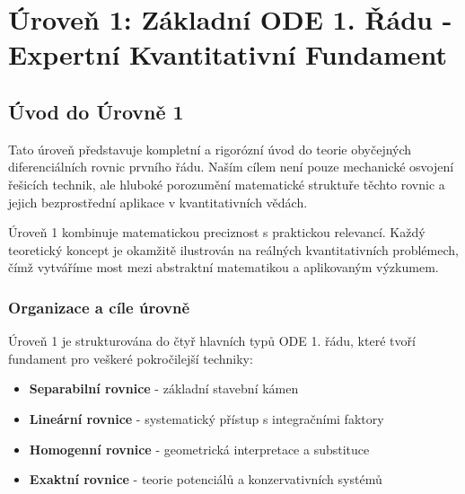\section{Úroveň 1: Základní ODE 1. Řádu - Expertní Kvantitativní Fundament}
\label{sec:uroven-1}

\subsection{Úvod do Úrovně 1}
\label{subsec:uvod-uroven-1}

Tato úroveň představuje kompletní a rigorózní úvod do teorie obyčejných diferenciálních rovnic prvního řádu. Naším cílem není pouze mechanické osvojení řešicích technik, ale hluboké porozumění matematické struktuře těchto rovnic a jejich bezprostřední aplikace v kvantitativních vědách.

\vspace{0.8\baselineskip}

\begin{principle}
Úroveň 1 kombinuje matematickou preciznost s praktickou relevancí. Každý teoretický koncept je okamžitě ilustrován na reálných kvantitativních problémech, čímž vytváříme most mezi abstraktní matematikou a aplikovaným výzkumem.
\end{principle}

\vspace{0.8\baselineskip}

\subsubsection*{Organizace a cíle úrovně}

Úroveň 1 je strukturována do čtyř hlavních typů ODE 1. řádu, které tvoří fundament pro veškeré pokročilejší techniky:

\begin{itemize}
\item \textbf{Separabilní rovnice} - základní stavební kámen
\item \textbf{Lineární rovnice} - systematický přístup s integračními faktory
\item \textbf{Homogenní rovnice} - geometrická interpretace a substituce
\item \textbf{Exaktní rovnice} - teorie potenciálů a konzervativních systémů
\end{itemize}

\vspace{0.8\baselineskip}

